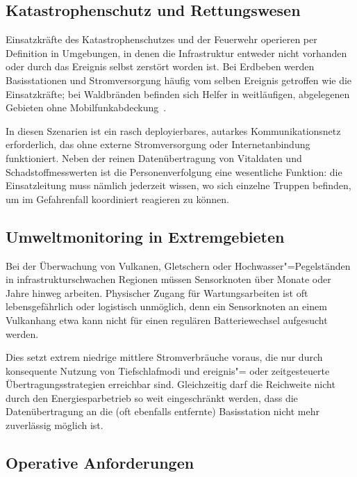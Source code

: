 \subsection{Katastrophenschutz und Rettungswesen}
\label{subsec:uc-katastrophenschutz}

Einsatzkräfte des Katastrophenschutzes und der Feuerwehr operieren per Definition
in Umgebungen, in denen die Infrastruktur entweder nicht vorhanden oder durch
das Ereignis selbst zerstört worden ist. Bei Erdbeben werden Basisstationen und
Stromversorgung häufig vom selben Ereignis getroffen wie die Einsatzkräfte; bei
Waldbränden befinden sich Helfer in weitläufigen, abgelegenen Gebieten ohne
Mobilfunkabdeckung~\cite{sciulloDesignPerformanceEvaluation2020}.

In diesen Szenarien ist ein rasch deployierbares, autarkes Kommunikationsnetz
erforderlich, das ohne externe Stromversorgung oder Internetanbindung funktioniert.
Neben der reinen Datenübertragung von Vitaldaten und Schadstoffmesswerten ist
die Personenverfolgung eine wesentliche Funktion: die Einsatzleitung muss nämlich jederzeit wissen, wo sich einzelne 
Truppen befinden, um im Gefahrenfall koordiniert reagieren zu können. 

\subsection{Umweltmonitoring in Extremgebieten}
\label{subsec:uc-umwelt}

Bei der Überwachung von Vulkanen, Gletschern oder Hochwasser"=Pegelständen
in infrastrukturschwachen Regionen müssen Sensorknoten über Monate oder Jahre
hinweg arbeiten. Physischer Zugang für Wartungsarbeiten ist oft
lebensgefährlich oder logistisch unmöglich, denn ein Sensorknoten an einem Vulkanhang etwa
kann nicht für einen regulären Batteriewechsel aufgesucht werden.

Dies setzt extrem niedrige mittlere Stromverbräuche voraus, die nur durch
konsequente Nutzung von Tiefschlafmodi und ereignis"= oder zeitgesteuerte
Übertragungsstrategien erreichbar sind. Gleichzeitig darf die Reichweite nicht
durch den Energiesparbetrieb so weit eingeschränkt werden, dass die Datenübertragung
an die (oft ebenfalls entfernte) Basisstation nicht mehr zuverlässig möglich ist.

\subsection{Operative Anforderungen}
\label{subsec:anforderungen-zusammenfassung}

